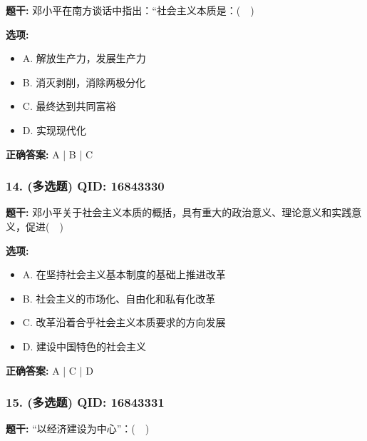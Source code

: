 \documentclass[12pt,UTF8]{ctexart}
\begin{document}
\textbf{题干:}
邓小平在南方谈话中指出：“社会主义本质是：(  )

\textbf{选项:}
\begin{itemize}[leftmargin=*]

  \item A. 解放生产力，发展生产力

  \item B. 消灭剥削，消除两极分化

  \item C. 最终达到共同富裕

  \item D. 实现现代化

\end{itemize}

\textbf{正确答案:}
A | B | C

\vspace{0.3em}\hrulefill\vspace{0.7em}

\subsubsection*{14. (多选题) \small QID: 16843330}

\textbf{题干:}
邓小平关于社会主义本质的概括，具有重大的政治意义、理论意义和实践意义，促进(  )

\textbf{选项:}
\begin{itemize}[leftmargin=*]

  \item A. 在坚持社会主义基本制度的基础上推进改革

  \item B. 社会主义的市场化、自由化和私有化改革

  \item C. 改革沿着合乎社会主义本质要求的方向发展

  \item D. 建设中国特色的社会主义

\end{itemize}

\textbf{正确答案:}
A | C | D

\vspace{0.3em}\hrulefill\vspace{0.7em}

\subsubsection*{15. (多选题) \small QID: 16843331}

\textbf{题干:}
“以经济建设为中心”：(  )
\end{document}
